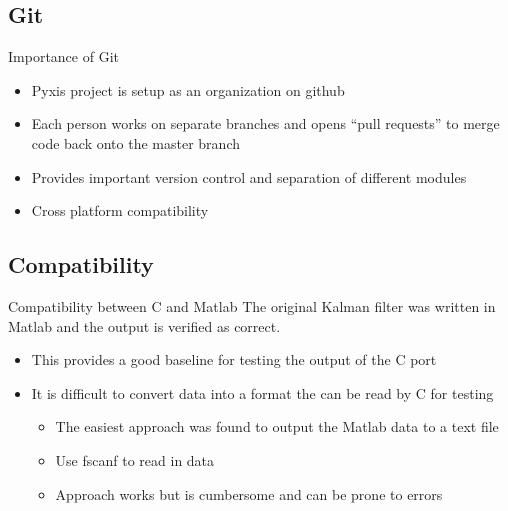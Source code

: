 \documentclass[10pt,aspectratio=169]{beamer}
\begin{document}
\subsection{Git}
    \begin{frame}{Importance of Git}
        \begin{itemize}
            \item Pyxis project is setup as an organization on github
            \item Each person works on separate branches and opens ``pull requests'' to merge code back onto the master branch
            \item Provides important version control and separation of different modules
            \item Cross platform compatibility
        \end{itemize}
    \end{frame}

\subsection{Compatibility}
    \begin{frame}{Compatibility between C and Matlab}
        The original Kalman filter was written in Matlab and the output is verified as correct.
        \begin{itemize}
            \item This provides a good baseline for testing the output of the C port
            \item It is difficult to convert data into a format the can be read by C for testing
                \begin{itemize}
                    \item The easiest approach was found to output the Matlab data to a text file
                    \item Use fscanf to read in data
                    \item Approach works but is cumbersome and can be prone to errors
                \end{itemize}
            \end{itemize}
    \end{frame}
\end{document}
